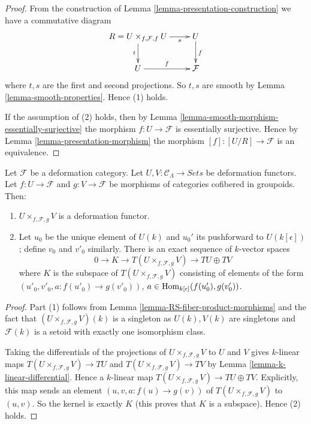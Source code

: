 \begin{proof}
From the construction of
Lemma \ref{lemma-presentation-construction}
we have a commutative diagram
$$
\xymatrix{
R = U \times_{f, \mathcal{F}, f} U \ar[r]_-s \ar[d]_t & U
\ar[d]^f \\
U \ar[r]^f & \mathcal{F}
}
$$
where $t, s$ are the first and second projections.  So $t, s$ are smooth by
Lemma \ref{lemma-smooth-properties}.  Hence (1) holds.

\medskip \noindent
If the assumption of (2) holds, then by
Lemma \ref{lemma-smooth-morphism-essentially-surjective}
the morphism $f : U \to \mathcal{F}$ is essentially surjective. Hence by
Lemma \ref{lemma-presentation-morphism}
the morphism $[f] : [U/R] \to \mathcal{F}$ is an equivalence.
\end{proof}

\begin{lemma}
\label{lemma-deformation-functor-fiber-product-morphisms}
Let $\mathcal{F}$ be a deformation category.
Let $U, V : \mathcal{C}_\Lambda \to \textit{Sets}$ be deformation functors.
Let $f: U \to \mathcal{F}$ and $g: V \to \mathcal{F}$ be morphisms of
categories cofibered in groupoids. Then:
\begin{enumerate}
\item $U \times_{f, \mathcal{F}, g} V$ is a deformation functor.
\item Let $u_0$ be the unique element of $U(k)$ and $u_0'$ its pushforward to
$U(k[\epsilon])$; define $v_0$ and $v'_0$ similarly. There is an exact
sequence of $k$-vector spaces
$$
0 \to K \to T(U \times_{f, \mathcal{F}, g} V) \to TU \oplus TV
$$
where $K$ is the subspace of $T(U \times_{f, \mathcal{F}, g} V)$
consisting of elements of the form
$(u'_0, v'_0, a : f(u'_0) \to g(v'_0))$,
$a \in \mathop{\rm Hom}\nolimits_{k[\epsilon]}(f(u'_0), g(v'_0))$.
\end{enumerate}
\end{lemma}

\begin{proof}
Part (1) follows from
Lemma \ref{lemma-RS-fiber-product-morphisms}
and the fact that $(U \times_{f, \mathcal{F}, g} V)(k)$ is a
singleton as $U(k), V(k)$ are singletons and $\mathcal{F}(k)$ is
a setoid with exactly one isomorphism class.

\medskip \noindent
Taking the differentials of the projections of
$U \times_{f, \mathcal{F}, g} V$ to $U$ and $V$ gives $k$-linear maps
$T(U \times_{f, \mathcal{F}, g} V) \to TU$ and
$T(U \times_{f, \mathcal{F}, g} V) \to TV$ by
Lemma \ref{lemma-k-linear-differential}.
Hence a $k$-linear map
$T(U \times_{f, \mathcal{F}, g} V) \to TU \oplus TV$.
Explicitly, this map sends an element $(u, v, a : f(u) \to g(v))$
of $T(U \times_{f, \mathcal{F}, g} V)$ to $(u, v)$.
So the kernel is exactly $K$ (this proves that $K$ is a subspace).
Hence (2) holds.
\end{proof}

